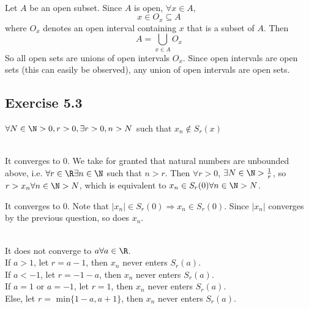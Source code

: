 \begin{solution}
 \\Let $A$ be an open subset. Since $A$ is open, $\forall x \in A$,
 $$x \in O_x \subseteq A$$
 where $O_x$ denotes an open interval containing $x$ that is a subset of $A$. Then
 $$A = \bigcup_{x \in A} O_x$$
 So all open sets are unions of open intervals $O_x$. Since open intervals are open sets (this can easily be observed), any union of open intervals are open sets.
\end{solution}

\subsection{Exercise 5.3}
\setcounter{question}{0}


\begin{solution}
 $\forall N \in \N > 0, r > 0, \exists r > 0, n > N$ such that $x_n \notin S_r(x)$
\end{solution}


\begin{solution}
 \\It converges to 0. We take for granted that natural numbers are unbounded above, i.e. $\forall r \in \R \exists n \in \N$ such that $n > r$. Then $\forall r > 0$,
 $\exists N \in \N > \frac{1}{r}$, so $r > x_n \forall n \in \N > N$, which is equivalent to $x_n \in S_r(0) \forall n \in \N > N$.
\end{solution}


\begin{solution}
It converges to 0. Note that $|x_n| \in S_r(0) \Rightarrow x_n \in S_r(0)$. Since $|x_n|$ converges by the previous question, so does $x_n$.
\end{solution}

 \label{alternatingsign}

\begin{solution}
 \\It does not converge to $a \forall a \in \R$. \\
 If $a > 1$, let $r = a - 1$, then $x_n$ never enters $S_r(a)$. \\
 If $a < -1$, let $r = -1-a$, then $x_n$ never enters $S_r(a)$. \\
 If $a = 1$ or $a = -1$, let $r = 1$, then $x_n$ never enters $S_r(a)$. \\
 Else, let $r = \text{ min} \{1-a,a+1\}$, then $x_n$ never enters $S_r(a)$.
\end{solution}

